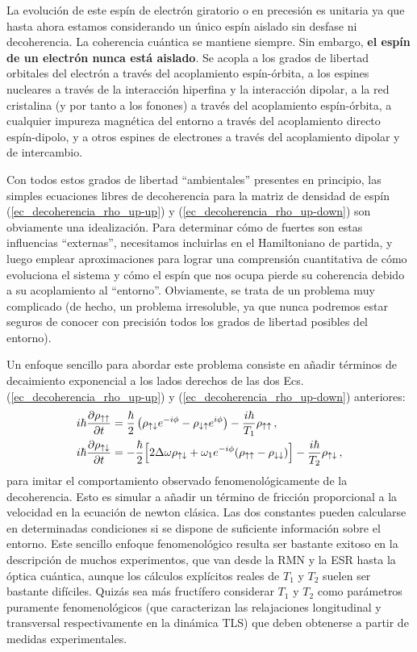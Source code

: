 \documentclass[a4paper,11pt]{book} %
\numberwithin{equation}{chapter}
\def\lp{\left(}
\def\rp{\right)}
\def\Lc{\Bigl[}
\def\Rc{\Bigr]}
\begin{document}
La evolución de este espín de electrón giratorio o en precesión es unitaria ya que hasta ahora estamos considerando un único espín aislado sin desfase ni decoherencia. La coherencia cuántica se mantiene siempre. Sin embargo, \textbf{el espín de un electrón nunca está aislado}. Se acopla a los grados de libertad orbitales del electrón a través del acoplamiento espín-órbita, a los espines nucleares a través de la interacción hiperfina y la interacción dipolar, a la red cristalina (y por tanto a los fonones) a través del acoplamiento espín-órbita, a cualquier impureza magnética del entorno a través del acoplamiento directo espín-dipolo, y a otros espines de electrones a través del acoplamiento dipolar y de intercambio. 

Con todos estos grados de libertad ``ambientales'' presentes en principio, las simples ecuaciones libres de decoherencia para la matriz de densidad de espín (\ref{ec_decoherencia_rho_up-up}) y (\ref{ec_decoherencia_rho_up-down}) son obviamente una idealización. Para determinar cómo de fuertes son estas influencias ``externas'', necesitamos incluirlas en el Hamiltoniano de partida, y luego emplear aproximaciones para lograr una comprensión cuantitativa de cómo evoluciona el sistema y cómo el espín que nos ocupa pierde su coherencia debido a su acoplamiento al ``entorno''. Obviamente, se trata de un problema muy complicado (de hecho, un problema irresoluble, ya que nunca podremos estar seguros de conocer con precisión todos los grados de libertad posibles del entorno). 

Un enfoque sencillo para abordar este problema consiste en añadir términos de decaimiento exponencial a los lados derechos de las dos Ecs. (\ref{ec_decoherencia_rho_up-up}) y (\ref{ec_decoherencia_rho_up-down}) anteriores:
	\begin{align}
	i \hbar \frac{\partial \rho_{\uparrow \uparrow}}{\partial t} & = \frac{\hbar}{2} \lp \rho_{\uparrow \downarrow} e^{-i \phi} - \rho_{\downarrow \uparrow} e^{i \phi} \rp - \frac{i \hbar}{T_1} \rho_{\uparrow \uparrow} \, , \label{ec_decoherencia_rho_up-up_ficcion} \\
	i \hbar \frac{\partial \rho_{\uparrow \downarrow}}{\partial t} & = 
	- \frac{\hbar}{2} \Lc 2 \Delta \omega \rho_{\uparrow \downarrow} + 
	\omega_1 e^{-i \phi} (\rho_{\uparrow \uparrow} - \rho_{\downarrow \downarrow}) \Rc - \frac{i \hbar}{T_2}  \rho_{\uparrow \downarrow} \, , \label{ec_decoherencia_rho_up-down_ficcion}
	\end{align}
para imitar el comportamiento observado fenomenológicamente de la decoherencia. Esto es simular a añadir un término de fricción proporcional a la velocidad en la ecuación de newton clásica. Las dos constantes pueden calcularse en determinadas condiciones si se dispone de suficiente información sobre el entorno. Este sencillo enfoque fenomenológico resulta ser bastante exitoso en la descripción de muchos experimentos, que van desde la RMN y la ESR hasta la óptica cuántica, aunque los cálculos explícitos reales de $T_1$ y $T_2$ suelen ser bastante difíciles. Quizás sea más fructífero considerar $T_1$ y $T_2$ como parámetros puramente fenomenológicos (que caracterizan las relajaciones longitudinal y transversal respectivamente en la dinámica TLS) que deben obtenerse a partir de medidas experimentales.
\end{document}
